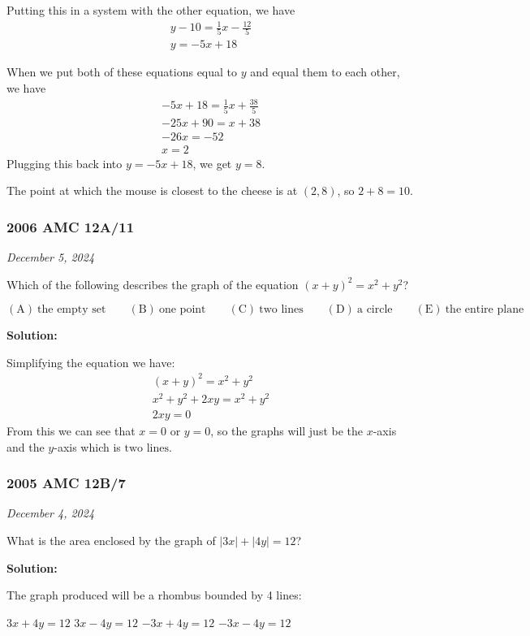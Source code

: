 \documentclass[../mathproblems.tex]{subfiles}
\begin{document}
Putting this in a system with the other equation, we have 
\begin{align*}
y - 10 = \frac{1}{5}x - \frac{12}{5} \\ 
y = -5x+18
\end{align*}

When we put both of these equations equal to $y$ and equal them to each other, we have  
\begin{align*}
-5x+18 = \frac{1}{5}x + \frac{38}{5}\\
-25x + 90 = x + 38 \\
-26x = -52 \\
x = 2
\end{align*}
Plugging this back into $y=-5x+18$, we get $y=8$.

The point at which the mouse is closest to the cheese is at $(2,8)$, so $2+8 = \boxed{10}$.

\noindent\hrulefill
\subsubsection*{2006 AMC 12A/11}
\textit{December 5, 2024}

Which of the following describes the graph of the equation $(x+y)^2=x^2+y^2$?

$\mathrm{(A)}\ \text{the empty set}\qquad\mathrm{(B)}\ \text{one point}\qquad\mathrm{(C)}\ \text{two lines}\qquad\mathrm{(D)}\ \text{a circle}\qquad\mathrm{(E)}\ \text{the entire plane}$ 

\textbf{Solution:}

Simplifying the equation we have:
\begin{align*}
    (x+y)^2=x^2+y^2\\
x^2+y^2+2xy=x^2+y^2 \\
2xy=0
\end{align*}
From this we can see that $x=0$ or $y=0$, so the graphs will just be the $x$-axis and the $y$-axis which is $\boxed{\text{two lines}}$.

\noindent\hrulefill
\subsubsection*{2005 AMC 12B/7} 
\textit{December 4, 2024}

What is the area enclosed by the graph of $|3x|+|4y|=12$?

\textbf{Solution:}

The graph produced will be a rhombus bounded by 4 lines:

$3x+4y=12$
$3x-4y =12$
$-3x+4y=12$
$-3x-4y=12$
\end{document}
